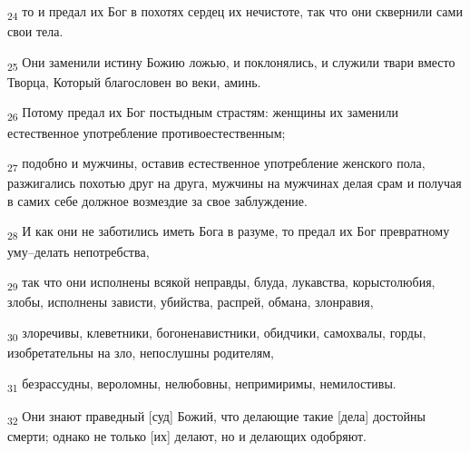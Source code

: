 \begin{tcolorbox}
\textsubscript{24} то и предал их Бог в похотях сердец их нечистоте, так что они сквернили сами свои тела.
\end{tcolorbox}
\begin{tcolorbox}
\textsubscript{25} Они заменили истину Божию ложью, и поклонялись, и служили твари вместо Творца, Который благословен во веки, аминь.
\end{tcolorbox}
\begin{tcolorbox}
\textsubscript{26} Потому предал их Бог постыдным страстям: женщины их заменили естественное употребление противоестественным;
\end{tcolorbox}
\begin{tcolorbox}
\textsubscript{27} подобно и мужчины, оставив естественное употребление женского пола, разжигались похотью друг на друга, мужчины на мужчинах делая срам и получая в самих себе должное возмездие за свое заблуждение.
\end{tcolorbox}
\begin{tcolorbox}
\textsubscript{28} И как они не заботились иметь Бога в разуме, то предал их Бог превратному уму--делать непотребства,
\end{tcolorbox}
\begin{tcolorbox}
\textsubscript{29} так что они исполнены всякой неправды, блуда, лукавства, корыстолюбия, злобы, исполнены зависти, убийства, распрей, обмана, злонравия,
\end{tcolorbox}
\begin{tcolorbox}
\textsubscript{30} злоречивы, клеветники, богоненавистники, обидчики, самохвалы, горды, изобретательны на зло, непослушны родителям,
\end{tcolorbox}
\begin{tcolorbox}
\textsubscript{31} безрассудны, вероломны, нелюбовны, непримиримы, немилостивы.
\end{tcolorbox}
\begin{tcolorbox}
\textsubscript{32} Они знают праведный [суд] Божий, что делающие такие [дела] достойны смерти; однако не только [их] делают, но и делающих одобряют.
\end{tcolorbox}
